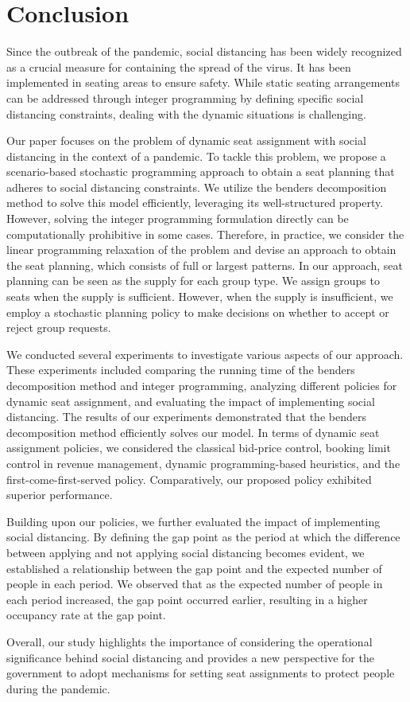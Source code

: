 \section{Conclusion}
Since the outbreak of the pandemic, social distancing has been widely recognized as a crucial measure for containing the spread of the virus. It has been implemented in seating areas to ensure safety. While static seating arrangements can be addressed through integer programming by defining specific social distancing constraints, dealing with the dynamic situations is challenging.

Our paper focuses on the problem of dynamic seat assignment with social distancing in the context of a pandemic. To tackle this problem, we propose a scenario-based stochastic programming approach to obtain a seat planning that adheres to social distancing constraints. We utilize the benders decomposition method to solve this model efficiently, leveraging its well-structured property. However, solving the integer programming formulation directly can be computationally prohibitive in some cases. Therefore, in practice, we consider the linear programming relaxation of the problem and devise an approach to obtain the seat planning, which consists of full or largest patterns. In our approach, seat planning can be seen as the supply for each group type. We assign groups to seats when the supply is sufficient. However, when the supply is insufficient, we employ a stochastic planning policy to make decisions on whether to accept or reject group requests. 


We conducted several experiments to investigate various aspects of our approach. These experiments included comparing the running time of the benders decomposition method and integer programming, analyzing different policies for dynamic seat assignment, and evaluating the impact of implementing social distancing. The results of our experiments demonstrated that the benders decomposition method efficiently solves our model. In terms of dynamic seat assignment policies, we considered the classical bid-price control, booking limit control in revenue management, dynamic programming-based heuristics, and the first-come-first-served policy. Comparatively, our proposed policy exhibited superior performance.

Building upon our policies, we further evaluated the impact of implementing social distancing. By defining the gap point as the period at which the difference between applying and not applying social distancing becomes evident, we established a relationship between the gap point and the expected number of people in each period. We observed that as the expected number of people in each period increased, the gap point occurred earlier, resulting in a higher occupancy rate at the gap point.

Overall, our study highlights the importance of considering the operational significance behind social distancing and provides a new perspective for the government to adopt mechanisms for setting seat assignments to protect people during the pandemic. 


